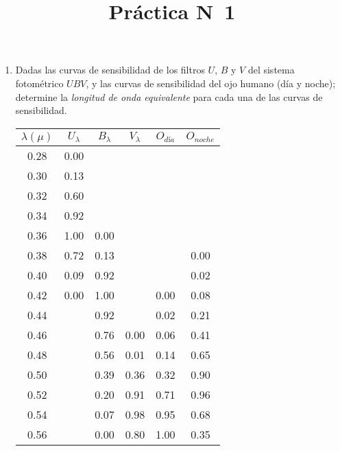 \documentclass[10pt,spanish,a4paper,1p]{practice}
\begin{document}
  \title{Práctica N\textdegree\ 1}
  \maketitle

    \begin{enumerate}[wide, labelwidth=!, labelindent=0pt, label=\textbf{\textrm{\arabic*)}}, ref=\arabic*]
    \item \label{prob:1} Dadas las curvas de sensibilidad de los filtros $U$, $B$ y $V$ del sistema fotométrico $UBV$, y las curvas de sensibilidad del ojo humano (día y noche); determine la \emph{longitud de onda equivalente} para cada una de las curvas de sensibilidad.

        \begin{table}[h!]
            \centering
            \begin{tabular}{ c | c | c | c | c | c }
                    $\lambda(\mu)$  & $U_\lambda$  & $B_\lambda$  & $V_\lambda$  & $O_{\textit{d\'ia}}$  & $O_{noche}$ \\\hline
                    0.28  & 0.00  &  &  &  &  \\
                    0.30  & 0.13  &  &  &  &  \\
                    0.32  & 0.60  &  &  &  &  \\
                    0.34  & 0.92  &  &  &  &  \\
                    0.36  & 1.00  & 0.00  &  &  &  \\
                    0.38  & 0.72  & 0.13  &  &  & 0.00 \\
                    0.40  & 0.09  & 0.92  &  &  & 0.02 \\
                    0.42  & 0.00  & 1.00  &  & 0.00  & 0.08 \\
                    0.44  &  & 0.92  &  & 0.02  & 0.21 \\
                    0.46  &  & 0.76  & 0.00  & 0.06  & 0.41 \\
                    0.48  &  & 0.56  & 0.01  & 0.14  & 0.65 \\
                    0.50  &  & 0.39  & 0.36  & 0.32  & 0.90 \\
                    0.52  &  & 0.20  & 0.91  & 0.71  & 0.96 \\
                    0.54  &  & 0.07  & 0.98  & 0.95  & 0.68 \\
                    0.56  &  & 0.00  & 0.80  & 1.00  & 0.35 \\

\end{tabular}
\end{table}
\end{enumerate}
\end{document}
